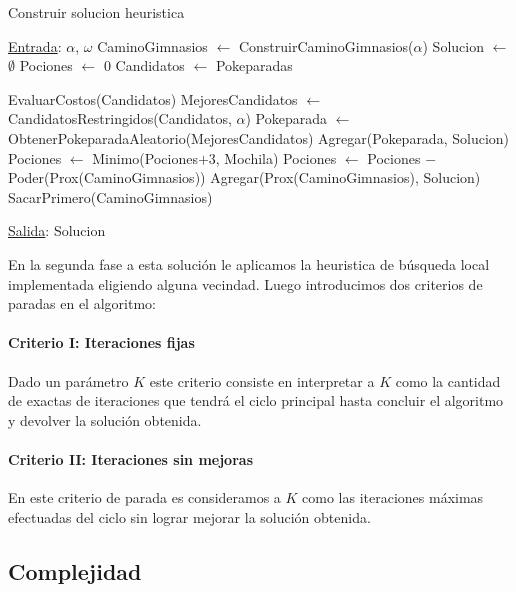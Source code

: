 \begin{algorithm}[H]

\label{}
\caption{Construir solucion heuristica}

\begin{algorithmic}[1]

\Statex \underline{Entrada}: $\alpha$, $\omega$
\medskip
\State CaminoGimnasios $\gets$ ConstruirCaminoGimnasios($\alpha$)
\State Solucion $\gets$ $\emptyset$
\State Pociones $\gets$ $0$
\State Candidatos $\gets$ Pokeparadas

		\State EvaluarCostos(Candidatos)
		\State MejoresCandidatos $\gets$ CandidatosRestringidos(Candidatos, $\alpha$)
		\State Pokeparada $\gets$ ObtenerPokeparadaAleatorio(MejoresCandidatos)
		\State Agregar(Pokeparada, Solucion)
		\State Pociones $\gets$ Minimo(Pociones$+3$, Mochila)
	\EndWhile
	\State Pociones $\gets$  Pociones $-$ Poder(Prox(CaminoGimnasios))
	\State  Agregar(Prox(CaminoGimnasios), Solucion)
	\State  SacarPrimero(CaminoGimnasios)
\EndWhile

\medskip
\Statex \underline{Salida}: Solucion

\end{algorithmic}
\end{algorithm}

En la segunda fase a esta solución le aplicamos la heuristica de búsqueda local implementada eligiendo alguna vecindad. Luego introducimos dos criterios de paradas en el algoritmo:

\paragraph{Criterio I: Iteraciones fijas}
Dado un parámetro $K$ este criterio consiste en interpretar a $K$ como la cantidad de exactas de iteraciones que tendrá el ciclo principal hasta concluir el algoritmo y devolver la solución obtenida.

\paragraph{Criterio II: Iteraciones sin mejoras}
En este criterio de parada es consideramos a $K$ como las iteraciones máximas efectuadas del ciclo sin lograr mejorar la solución obtenida.


\subsection{Complejidad}

